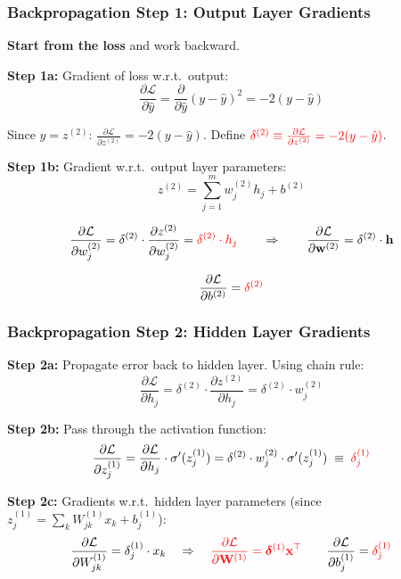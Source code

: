 \documentclass[notes,11pt, aspectratio=169]{beamer}
\newcommand{\vx}{\mathbf{x}}
\newcommand{\vw}{\mathbf{w}}
\newcommand{\vh}{\mathbf{h}}
\newcommand{\vW}{\mathbf{W}}
\newcommand{\pd}[2]{\frac{\partial #1}{\partial #2}}
\begin{document}
\begin{frame}
\frametitle{Backpropagation Step 1: Output Layer Gradients}

\textbf{Start from the loss} and work backward.

\vspace{6pt}
\textbf{Step 1a:} Gradient of loss w.r.t.\ output:
\[
    \pd{\mathcal{L}}{\hat{y}} = \pd{}{\hat{y}}(y - \hat{y})^2 = -2(y - \hat{y})
\]

Since $\hat{y} = z^{(2)}$: \quad $\pd{\mathcal{L}}{z^{(2)}} = -2(y - \hat{y})$. \quad Define $\textcolor{red}{\delta^{(2)} \equiv \pd{\mathcal{L}}{z^{(2)}} = -2(y - \hat{y})}$.

\vspace{8pt}
\textbf{Step 1b:} Gradient w.r.t.\ output layer parameters:
\[
    z^{(2)} = \sum_{j=1}^{m} w_j^{(2)} h_j + b^{(2)}
\]

\[
    \pd{\mathcal{L}}{w_j^{(2)}} = \delta^{(2)} \cdot \pd{z^{(2)}}{w_j^{(2)}} = \textcolor{red}{\delta^{(2)} \cdot h_j} \qquad \Rightarrow \qquad \pd{\mathcal{L}}{\vw^{(2)}} = \delta^{(2)} \cdot \vh
\]

\[
    \pd{\mathcal{L}}{b^{(2)}} = \textcolor{red}{\delta^{(2)}}
\]
\end{frame}

\begin{frame}
\frametitle{Backpropagation Step 2: Hidden Layer Gradients}

\textbf{Step 2a:} Propagate error back to hidden layer. Using chain rule:
\[
    \pd{\mathcal{L}}{h_j} = \delta^{(2)} \cdot \pd{z^{(2)}}{h_j} = \delta^{(2)} \cdot w_j^{(2)}
\]

\textbf{Step 2b:} Pass through the activation function:
\[
    \pd{\mathcal{L}}{z_j^{(1)}} = \pd{\mathcal{L}}{h_j} \cdot \sigma'(z_j^{(1)}) = \delta^{(2)} \cdot w_j^{(2)} \cdot \sigma'(z_j^{(1)}) \;\equiv\; \textcolor{red}{\delta_j^{(1)}}
\]

\textbf{Step 2c:} Gradients w.r.t.\ hidden layer parameters (since $z_j^{(1)} = \sum_k W_{jk}^{(1)} x_k + b_j^{(1)}$):
\[
    \pd{\mathcal{L}}{W_{jk}^{(1)}} = \delta_j^{(1)} \cdot x_k \quad \Rightarrow \quad \textcolor{red}{\pd{\mathcal{L}}{\vW^{(1)}} = \bm{\delta}^{(1)} \vx^\top}
    \qquad
    \pd{\mathcal{L}}{b_j^{(1)}} = \textcolor{red}{\delta_j^{(1)}}
\]
\end{frame}
\end{document}
